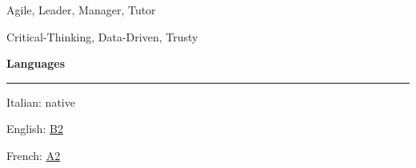 \documentclass[11pt,letterpaper]{article}
\begin{document}
\begin{justify}
\begin{minipage}[t]{6.6cm}
\begin{itemize}[label={}, leftmargin=0pt]
                  \begin{item}
                        Agile, Leader, Manager, Tutor
                  \end{item}
                  \begin{item}
                        Critical-Thinking, Data-Driven, Trusty
                  \end{item}
            \end{itemize}
      \end{minipage}
      \hfill
      \begin{minipage}[t]{2.5cm}
            \textbf{Languages}\strut
            \hrule
            \vspace{0.2cm}
            \begin{itemize}[label={}, leftmargin=0pt]
                  \begin{item}
                        Italian: native
                  \end{item}
                  \begin{item}
                        English:
                        \href{https://dariocurr.github.io/assets/doc/B2_english.pdf}{B2}
                  \end{item}
                  \begin{item}
                        French:
                        \href{https://dariocurr.github.io/assets/doc/A2_french.pdf}{A2}
                  \end{item}
            \end{itemize}
      \end{minipage}
\end{justify}
\end{document}
